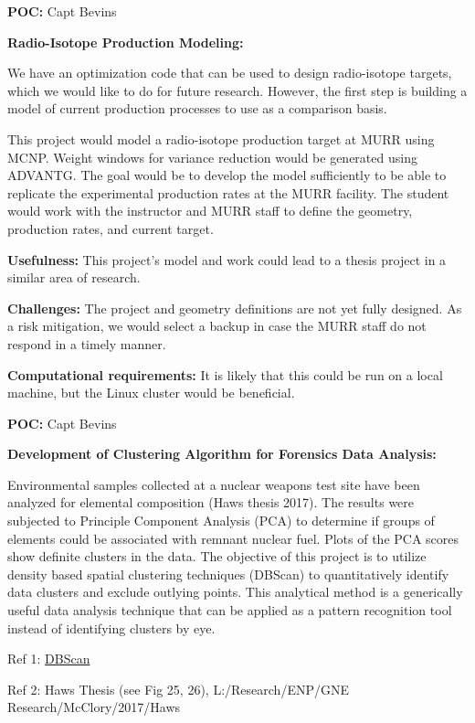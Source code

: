 \documentclass[12pt, answers]{exam}
\begin{document}
\begin{questions}
\textbf{POC:} Capt Bevins

 
\newpage

\question \textbf{Radio-Isotope Production Modeling:}

We have an optimization code that can be used to design radio-isotope targets, which we would like to do for future research.
However, the first step is building a model of current production processes to use as a comparison basis.

This project would model a radio-isotope production target at MURR using MCNP.
Weight windows for variance reduction would be generated using ADVANTG.  
The goal would be to develop the model sufficiently to be able to replicate the experimental production rates at the MURR facility. 
The student would work with the instructor and MURR staff to define the geometry, production rates, and current target.

\textbf{Usefulness:} 
This project's model and work could lead to a thesis project in a similar area of research.  

\textbf{Challenges:}
The project and geometry definitions are not yet fully designed.
As a risk mitigation, we would select a backup in case the MURR staff do not respond in a timely manner.

\textbf{Computational requirements:}
It is likely that this could be run on a local machine, but the Linux cluster would be beneficial.

\textbf{POC:} Capt Bevins

\newpage

\question \textbf{Development of Clustering Algorithm for Forensics Data Analysis:}

Environmental samples collected at a nuclear weapons test site have been analyzed for elemental composition (Haws thesis 2017).  The results were subjected to Principle Component Analysis (PCA) to determine if groups of elements could be associated with remnant nuclear fuel.  Plots of the PCA scores show definite clusters in the data.  The objective of this project is to utilize density based spatial clustering techniques (DBScan) to quantitatively identify data clusters and exclude outlying points.  This analytical method is a generically useful data analysis technique that can be applied as a pattern recognition tool instead of identifying clusters by eye.

Ref 1: \href{https://en.wikipedia.org/wiki/DBSCAN}{DBScan}

Ref 2: Haws Thesis (see Fig  25, 26), L:/Research/ENP/GNE Research/McClory/2017/Haws


\end{questions}
\end{document}
